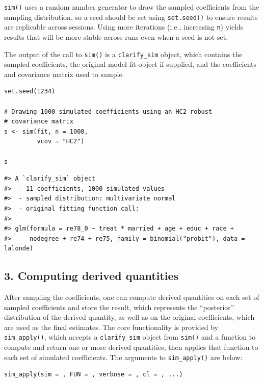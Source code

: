 \texttt{sim()} uses a random number generator to draw the sampled coefficients from the sampling distribution, so a seed should be set using \texttt{set.seed()} to ensure results are replicable across sessions. Using more iterations (i.e., increasing \texttt{n}) yields results that will be more stable across runs even when a seed is not set.

The output of the call to \texttt{sim()} is a \texttt{clarify\_sim} object, which contains the sampled coefficients, the original model fit object if supplied, and the coefficients and covariance matrix used to sample.

\begin{verbatim}
set.seed(1234)

# Drawing 1000 simulated coefficients using an HC2 robust
# covariance matrix
s <- sim(fit, n = 1000,
         vcov = "HC2")

s
\end{verbatim}

\begin{verbatim}
#> A `clarify_sim` object
#>  - 11 coefficients, 1000 simulated values
#>  - sampled distribution: multivariate normal
#>  - original fitting function call:
#> 
#> glm(formula = re78_0 ~ treat * married + age + educ + race + 
#>     nodegree + re74 + re75, family = binomial("probit"), data = lalonde)
\end{verbatim}

\subsection{3. Computing derived quantities}\label{computing-derived-quantities}

After sampling the coefficients, one can compute derived quantities on each set of sampled coefficients and store the result, which represents the ``posterior'' distribution of the derived quantity, as well as on the original coefficients, which are used as the final estimates. The core functionality is provided by \texttt{sim\_apply()}, which accepts a \texttt{clarify\_sim} object from \texttt{sim()} and a function to compute and return one or more derived quantities, then applies that function to each set of simulated coefficients. The arguments to \texttt{sim\_apply()} are below:

\begin{verbatim}
sim_apply(sim = , FUN = , verbose = , cl = , ...)
\end{verbatim}

